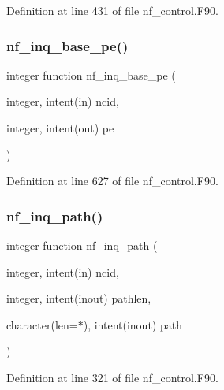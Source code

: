 Definition at line 431 of file nf\+\_\+control.\+F90.

\mbox{\label{nf__control_8F90_a1405b5aed252a4c5bf44fef21c5cdb3a}} 
\subsubsection{\texorpdfstring{nf\+\_\+inq\+\_\+base\+\_\+pe()}{nf\_inq\_base\_pe()}}
{\footnotesize\ttfamily integer function nf\+\_\+inq\+\_\+base\+\_\+pe (\begin{DoxyParamCaption}\item[{integer, intent(in)}]{ncid,  }\item[{integer, intent(out)}]{pe }\end{DoxyParamCaption})}



Definition at line 627 of file nf\+\_\+control.\+F90.

\mbox{\label{nf__control_8F90_a19cae08e2196f90ae244bba22863388e}} 
\subsubsection{\texorpdfstring{nf\+\_\+inq\+\_\+path()}{nf\_inq\_path()}}
{\footnotesize\ttfamily integer function nf\+\_\+inq\+\_\+path (\begin{DoxyParamCaption}\item[{integer, intent(in)}]{ncid,  }\item[{integer, intent(inout)}]{pathlen,  }\item[{character(len=$\ast$), intent(inout)}]{path }\end{DoxyParamCaption})}



Definition at line 321 of file nf\+\_\+control.\+F90.

\mbox{\label{nf__control_8F90_a0f8151804ce6cb953b4686b035fd0b66}} 
